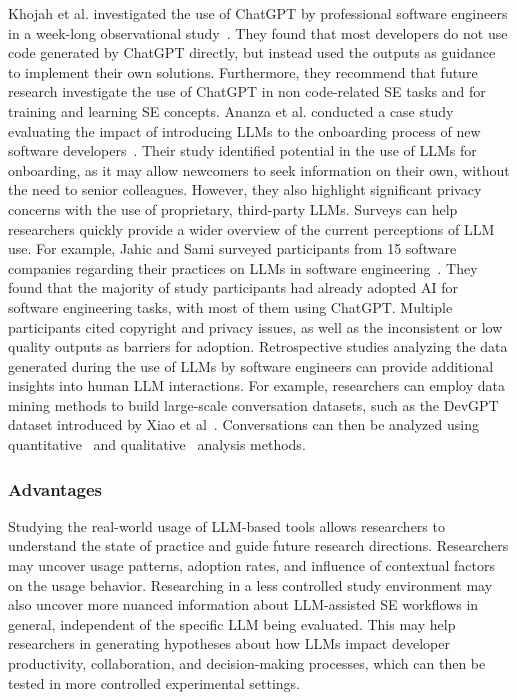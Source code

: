 Khojah et al. investigated the use of ChatGPT by professional software engineers in a week-long observational study~\cite{DBLP:journals/pacmse/KhojahM0N24}.
They found that most developers do not use code generated by ChatGPT directly, but instead used the outputs as guidance to implement their own solutions.
Furthermore, they recommend that future research investigate the use of ChatGPT in non code-related SE tasks and for training and learning SE concepts.
Ananza et al. conducted a case study evaluating the impact of introducing LLMs to the onboarding process of new software developers~\cite{DBLP:conf/csee/AzanzaPIG24}.
Their study identified potential in the use of LLMs for onboarding, as it may allow newcomers to seek information on their own, without the need to  senior colleagues.
However, they also highlight significant privacy concerns with the use of proprietary, third-party LLMs.
Surveys can help researchers quickly provide a wider overview of the current perceptions of LLM use.
For example, Jahic and Sami surveyed participants from 15 software companies regarding their practices on LLMs in software engineering~\cite{DBLP:conf/icsa/JahicS24}.
They found that the majority of study participants had already adopted AI for software engineering tasks, with most of them using ChatGPT.
Multiple participants cited copyright and privacy issues, as well as the inconsistent or low quality outputs as barriers for adoption.
Retrospective studies analyzing the data generated during the use of LLMs by software engineers can provide additional insights into human LLM interactions.
For example, researchers can employ data mining methods to build large-scale conversation datasets, such as the DevGPT dataset introduced by Xiao et al~\cite{DBLP:conf/msr/XiaoTHM24}.
Conversations can then be analyzed using quantitative~\cite{DBLP:conf/msr/RabbiCZI24} and qualitative~\cite{DBLP:conf/msr/MohamedPP24} analysis methods.

\subsubsection{Advantages}

Studying the real-world usage of LLM-based tools allows researchers to understand the state of practice and guide future research directions.
Researchers may uncover usage patterns, adoption rates, and influence of contextual factors on the usage behavior.
Researching in a less controlled study environment may also uncover more nuanced information about LLM-assisted SE workflows in general, independent of the specific LLM being evaluated.
This may help researchers in generating hypotheses about how LLMs impact developer productivity, collaboration, and decision-making processes, which can then be tested in more controlled experimental settings.

